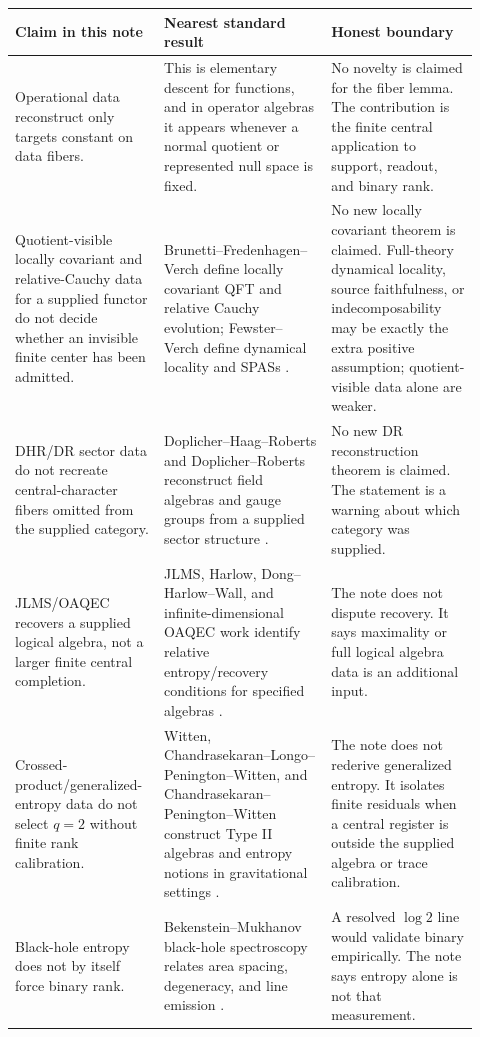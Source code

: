 \documentclass[12pt]{article}
\theoremstyle{definition}
\theoremstyle{remark}
\begin{document}
\begin{longtable}{p{0.28\linewidth}p{0.34\linewidth}p{0.30\linewidth}}
\toprule
Claim in this note & Nearest standard result & Honest boundary \\
\midrule
Operational data reconstruct only targets constant on data fibers. &
This is elementary descent for functions, and in operator algebras it appears
whenever a normal quotient or represented null space is fixed. &
No novelty is claimed for the fiber lemma.  The contribution is the finite
central application to support, readout, and binary rank. \\
\addlinespace
Quotient-visible locally covariant and relative-Cauchy data for a supplied
functor do not decide whether an invisible finite center has been admitted. &
Brunetti--Fredenhagen--Verch define locally covariant QFT and relative Cauchy
evolution; Fewster--Verch define dynamical locality and SPASs
\cite{BFV,FewsterVerch}. &
No new locally covariant theorem is claimed.  Full-theory dynamical locality,
source faithfulness, or indecomposability may be exactly the extra positive
assumption; quotient-visible data alone are weaker. \\
\addlinespace
DHR/DR sector data do not recreate central-character fibers omitted from the
supplied category. &
Doplicher--Haag--Roberts and Doplicher--Roberts reconstruct field algebras and
gauge groups from a supplied sector structure \cite{DHR1,DHR2,DR}. &
No new DR reconstruction theorem is claimed.  The statement is a warning about
which category was supplied. \\
\addlinespace
JLMS/OAQEC recovers a supplied logical algebra, not a larger finite central
completion. &
JLMS, Harlow, Dong--Harlow--Wall, and infinite-dimensional OAQEC work identify
relative entropy/recovery conditions for specified algebras
\cite{JLMS,HarlowRT,DHW,KangKolchmeyer}. &
The note does not dispute recovery.  It says maximality or full logical
algebra data is an additional input. \\
\addlinespace
Crossed-product/generalized-entropy data do not select \(q=2\) without finite
rank calibration. &
Witten, Chandrasekaran--Longo--Penington--Witten, and
Chandrasekaran--Penington--Witten construct Type II algebras and entropy
notions in gravitational settings \cite{WittenCrossed,CLPW,CPW}. &
The note does not rederive generalized entropy.  It isolates finite residuals
when a central register is outside the supplied algebra or trace calibration. \\
\addlinespace
Black-hole entropy does not by itself force binary rank. &
Bekenstein--Mukhanov black-hole spectroscopy relates area spacing, degeneracy,
and line emission \cite{BekensteinMukhanov}. &
A resolved \(\log 2\) line would validate binary empirically.  The note says
entropy alone is not that measurement. \\
\bottomrule
\end{longtable}
\end{document}

